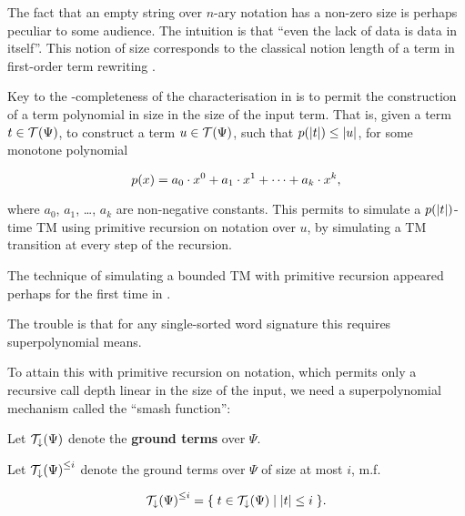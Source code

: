 \begin{remark} The fact that an empty string over $n$-ary notation has a
non-zero size is perhaps peculiar to some audience. The intuition is that
``even the lack of data is data in itself''. This notion of size corresponds to
the classical notion length of a term in first-order term rewriting
\cite{klop-vrijer-2003}. \end{remark}

Key to the \FPTIME{}-completeness of the characterisation in \cite{cobham-1965}
is to permit the construction of a term polynomial in size in the size of the
input term.  That is, given a term $t \in \mathcal{T}{\mathopen{}\left({\Psi}\right)\mathclose{}}$, to construct a
term $u \in \mathcal{T}{\mathopen{}\left({\Psi}\right)\mathclose{}}$, such that $p{\mathopen{}\left({{\mathopen{}\left|{t}\right|\mathclose{}}}\right)\mathclose{}} \leq {\ensuremath{\mathopen{}\left|{u}\right|\mathclose{}}}$, for
some monotone polynomial

$$p{\mathopen{}\left({x}\right)\mathclose{}}=a_0 \cdot x^0 + a_1 \cdot x^1 + \cdots + a_k \cdot x^k,$$

where $a_0$, $a_1$, \ldots, $a_k$ are non-negative constants. This permits to
simulate a $p{\mathopen{}\left({{\mathopen{}\left|{t}\right|\mathclose{}}}\right)\mathclose{}}$-time TM using primitive recursion on notation over
$u$, by simulating a TM transition at every step of the recursion.

\begin{remark} The technique of simulating a bounded TM with primitive
recursion appeared perhaps for the first time in \cite[.1/176]{minsky-1967}.  \end{remark}

The trouble is that for any single-sorted word signature this requires
superpolynomial means.


 
To attain this with primitive recursion on notation, which
permits only a recursive call depth linear in the size of the input, we need a
superpolynomial mechanism called the ``smash function'': 


\begin{definition} Let $\mathcal{T}_\downarrow{\ensuremath{\mathopen{}\left({\Psi}\right)\mathclose{}}}$ denote the
\textbf{ground terms} over $\Psi$. \end{definition}

\begin{definition} Let $\mathcal{T}_\downarrow{\ensuremath{\mathopen{}\left({\Psi}\right)\mathclose{}}}^{\leq i}$ denote the
ground terms over $\Psi$ of size at most $i$, m.f.

$$\mathcal{T}_\downarrow{\ensuremath{\mathopen{}\left({\Psi}\right)\mathclose{}}}^{\leq i} = \mathopen{}\left\{\mathrel{}{ t \in
\mathcal{T}_\downarrow{\ensuremath{\mathopen{}\left({\Psi}\right)\mathclose{}}} \mathrel{}\mid\mathrel{}{ {\mathopen{}\left|{t}\right|\mathclose{}} \leq i }}\mathrel{}\right\}\mathclose{}.$$

\end{definition}

